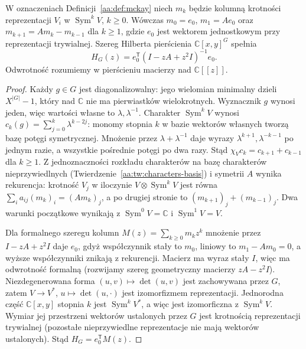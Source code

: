 \begin{twierdzenie}
\label{aa:tw:mckay-recurrence}
W oznaczeniach Definicji~\ref{aa:def:mckay} niech
$m_k$ będzie kolumną krotności reprezentacji $V_i$
w $\operatorname{Sym}^k V$, $k\ge0$.
Wówczas $m_0=e_0$, $m_1=Ae_0$ oraz
$m_{k+1}=Am_k-m_{k-1}$ dla $k\ge1$, gdzie $e_0$
jest wektorem jednostkowym przy reprezentacji trywialnej.
Szereg Hilberta pierścienia $\mathbb C[x,y]^G$ spełnia
\[
 H_G(z)=e_0^{\mathsf T}(I-zA+z^2 I)^{-1}e_0.
\]
Odwrotność rozumiemy w pierścieniu macierzy nad
$\mathbb C[[z]]$.
\end{twierdzenie}
\begin{proof}
Każdy $g\in G$ jest diagonalizowalny: jego wielomian
minimalny dzieli $X^{|G|}-1$, który nad $\mathbb C$
nie ma pierwiastków wielokrotnych. Wyznacznik
$g$ wynosi jeden, więc wartości własne to
$\lambda,\lambda^{-1}$. Charakter $\operatorname{Sym}^k V$ wynosi
$c_k(g)=\sum_{j=0}^k\lambda^{k-2j}$:
monomy stopnia $k$ w bazie wektorów własnych tworzą
bazę potęgi symetrycznej. Mnożenie przez
$\lambda+\lambda^{-1}$ daje wyrazy
$\lambda^{k+1},\lambda^{-k-1}$ po jednym razie,
a wszystkie pośrednie potęgi po dwa razy. Stąd
$\chi_V c_k=c_{k+1}+c_{k-1}$ dla $k\ge1$.
Z jednoznaczności rozkładu charakterów na bazę
charakterów nieprzywiedlnych
(Twierdzenie~\ref{aa:tw:characters-basis}) i symetrii $A$
wynika rekurencja: krotność $V_j$ w iloczynie
$V\otimes\operatorname{Sym}^k V$ jest równa
$\sum_i a_{ij}(m_k)_i=(Am_k)_j$, a po drugiej
stronie to $(m_{k+1})_j+(m_{k-1})_j$.
Dwa warunki początkowe wynikają
z $\operatorname{Sym}^0 V=\mathbb C$ i
$\operatorname{Sym}^1 V=V$.

Dla formalnego szeregu kolumn $M(z)=\sum_{k\ge0}m_kz^k$
mnożenie przez $I-zA+z^2I$ daje $e_0$, gdyż
współczynnik stały to $m_0$, liniowy to $m_1-Am_0=0$,
a wyższe współczynniki znikają z rekurencji.
Macierz ma wyraz stały $I$, więc ma odwrotność
formalną (rozwijamy szereg geometryczny macierzy
$zA-z^2I$). Niezdegenerowana forma
$(u,v)\mapsto\det(u,v)$ jest zachowywana przez $G$,
zatem $V\to V^*$, $u\mapsto\det(u,\cdot)$ jest
izomorfizmem reprezentacji. Jednorodna część
$\mathbb C[x,y]$ stopnia $k$ jest $\operatorname{Sym}^k V^*$,
a więc jest izomorficzna z $\operatorname{Sym}^k V$.
Wymiar jej przestrzeni wektorów ustalonych przez $G$
jest krotnością reprezentacji trywialnej (pozostałe
nieprzywiedlne reprezentacje nie mają wektorów ustalonych).
Stąd $H_G=e_0^{\mathsf T}M(z)$.
\end{proof}

